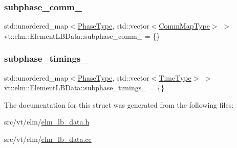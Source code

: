 \subsubsection{\texorpdfstring{subphase\+\_\+comm\+\_\+}{subphase\_comm\_}}
{\footnotesize\ttfamily std\+::unordered\+\_\+map$<$\hyperlink{namespacevt_a46ce6733d5cdbd735d561b7b4029f6d7}{Phase\+Type}, std\+::vector$<$\hyperlink{namespacevt_1_1elm_a38487cb8896b9b4763efa9022fab560e}{Comm\+Map\+Type}$>$ $>$ vt\+::elm\+::\+Element\+L\+B\+Data\+::subphase\+\_\+comm\+\_\+ = \{\}\hspace{0.3cm}{\ttfamily [protected]}}

\mbox{\label{structvt_1_1elm_1_1_element_l_b_data_ae8d11d0e5d42492873cf8a3a0e90470b}} 
\subsubsection{\texorpdfstring{subphase\+\_\+timings\+\_\+}{subphase\_timings\_}}
{\footnotesize\ttfamily std\+::unordered\+\_\+map$<$\hyperlink{namespacevt_a46ce6733d5cdbd735d561b7b4029f6d7}{Phase\+Type}, std\+::vector$<$\hyperlink{namespacevt_a876a9d0cd5a952859c72de8a46881442}{Time\+Type}$>$ $>$ vt\+::elm\+::\+Element\+L\+B\+Data\+::subphase\+\_\+timings\+\_\+ = \{\}\hspace{0.3cm}{\ttfamily [protected]}}



The documentation for this struct was generated from the following files\+:\begin{DoxyCompactItemize}
\item 
src/vt/elm/\hyperlink{elm__lb__data_8h}{elm\+\_\+lb\+\_\+data.\+h}\item 
src/vt/elm/\hyperlink{elm__lb__data_8cc}{elm\+\_\+lb\+\_\+data.\+cc}\end{DoxyCompactItemize}
